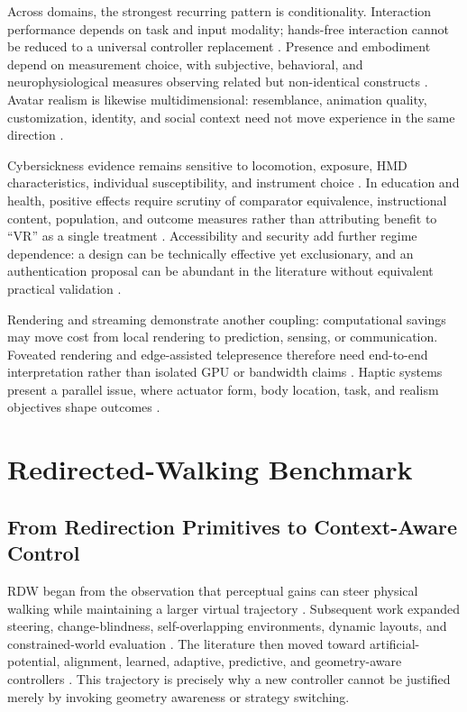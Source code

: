 Across domains, the strongest recurring pattern is conditionality. Interaction performance depends on task and input modality; hands-free interaction cannot be reduced to a universal controller replacement \cite{Monteiro2021HandsFree}. Presence and embodiment depend on measurement choice, with subjective, behavioral, and neurophysiological measures observing related but non-identical constructs \cite{Cummings2016ImmersionPresence,EmbodimentEEG2025}. Avatar realism is likewise multidimensional: resemblance, animation quality, customization, identity, and social context need not move experience in the same direction \cite{HumanlikeAvatars2024}.

Cybersickness evidence remains sensitive to locomotion, exposure, HMD characteristics, individual susceptibility, and instrument choice \cite{Caserman2021Cybersickness,Kennedy1993SSQ}. In education and health, positive effects require scrutiny of comparator equivalence, instructional content, population, and outcome measures rather than attributing benefit to ``VR'' as a single treatment \cite{Merchant2014VREducationMeta,Woon2021NursingVR,Lawson2024Confounded}. Accessibility and security add further regime dependence: a design can be technically effective yet exclusionary, and an authentication proposal can be abundant in the literature without equivalent practical validation \cite{Dudley2023InclusiveImmersion,Giaretta2025VRSecurity}.

Rendering and streaming demonstrate another coupling: computational savings may move cost from local rendering to prediction, sensing, or communication. Foveated rendering and edge-assisted telepresence therefore need end-to-end interpretation rather than isolated GPU or bandwidth claims \cite{Wang2023FoveatedSurvey,Xu2023VRStreaming}. Haptic systems present a parallel issue, where actuator form, body location, task, and realism objectives shape outcomes \cite{Frisoli2024WearableHaptics}.

\section{Redirected-Walking Benchmark}
\subsection{From Redirection Primitives to Context-Aware Control}
RDW began from the observation that perceptual gains can steer physical walking while maintaining a larger virtual trajectory \cite{Razzaque2001RedirectedWalking,Steinicke2010DetectionThresholds,Peck2010ImprovedRedirection,Grechkin2016Thresholds}. Subsequent work expanded steering, change-blindness, self-overlapping environments, dynamic layouts, and constrained-world evaluation \cite{Suma2012ImpossibleSpaces,Vasylevska2013FlexibleSpaces,Hodgson2014Constrained,Sun2018Saccadic}. The literature then moved toward artificial-potential, alignment, learned, adaptive, predictive, and geometry-aware controllers \cite{Thomas2019P2R,Bachmann2019APF,Strauss2020RL,Williams2021VisibilityPolygons,Azmandian2022Adaptive,Chen2024APFS2T,Wang2026DGMRDW}. This trajectory is precisely why a new controller cannot be justified merely by invoking geometry awareness or strategy switching.

